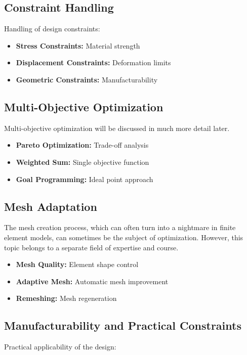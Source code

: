 \subsection{Constraint Handling}
Handling of design constraints:

\begin{itemize}
    \item \textbf{Stress Constraints:} Material strength
    \item \textbf{Displacement Constraints:} Deformation limits
    \item \textbf{Geometric Constraints:} Manufacturability
\end{itemize}

\subsection{Multi-Objective Optimization}
Multi-objective optimization will be discussed in much more detail later.

\begin{tcolorbox}[title=Multi-Objective Approaches]
\begin{itemize}
    \item \textbf{Pareto Optimization:} Trade-off analysis
    \item \textbf{Weighted Sum:} Single objective function
    \item \textbf{Goal Programming:} Ideal point approach
\end{itemize}
\end{tcolorbox}

\subsection{Mesh Adaptation}
The mesh creation process, which can often turn into a nightmare in finite element models, can sometimes be the subject of optimization. However, this topic belongs to a separate field of expertise and course.

\begin{itemize}
    \item \textbf{Mesh Quality:} Element shape control
    \item \textbf{Adaptive Mesh:} Automatic mesh improvement
    \item \textbf{Remeshing:} Mesh regeneration
\end{itemize}

\subsection{Manufacturability and Practical Constraints}
Practical applicability of the design:

